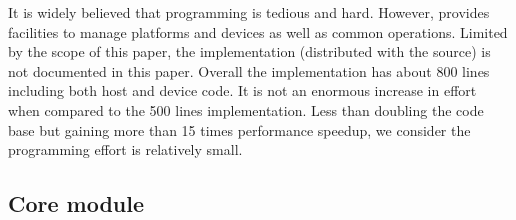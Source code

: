 It is widely believed that \opencl programming is tedious and hard. However,
\vsmc provides facilities to manage \opencl platforms and devices as well as
common operations. Limited by the scope of this paper, the \opencl
implementation (distributed with the \vsmc source) is not documented in this
paper. Overall the \opencl implementation has about 800 lines including both
host and device code. It is not an enormous increase in effort when compared
to the 500 lines \smp implementation. Less than doubling the code base but
gaining more than 15 times performance speedup, we consider the programming
effort is relatively small.

\subsection{Core module}
\label{sub:Core module}

